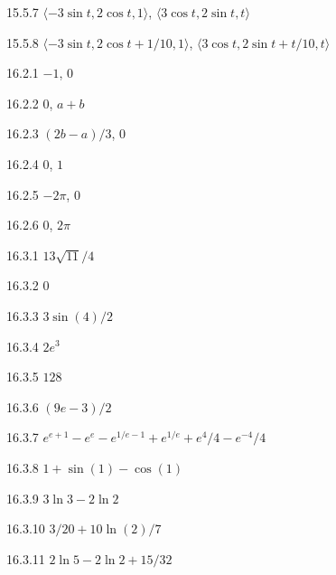 \begin{Answer}{15.5.7}
	$\langle -3\sin t,2\cos t,1\rangle$,
	$\langle 3\cos t, 2\sin t,t\rangle$
\end{Answer}
\begin{Answer}{15.5.8}
	$\langle -3\sin t,2\cos t+1/10,1\rangle$,
	$\langle 3\cos t, 2\sin t+t/10,t\rangle$
\end{Answer}
\begin{Answer}{16.2.1}
	$-1$, $0$
\end{Answer}
\begin{Answer}{16.2.2}
	$0$, $a+b$
\end{Answer}
\begin{Answer}{16.2.3}
	$(2b-a)/3$, $0$
\end{Answer}
\begin{Answer}{16.2.4}
	$0$, $1$
\end{Answer}
\begin{Answer}{16.2.5}
	$-2\pi$, $0$
\end{Answer}
\begin{Answer}{16.2.6}
	$0$, $2\pi$
\end{Answer}
\begin{Answer}{16.3.1}
	$13\sqrt{11}/4$
\end{Answer}
\begin{Answer}{16.3.2}
	$0$
\end{Answer}
\begin{Answer}{16.3.3}
	$3\sin(4)/2$
\end{Answer}
\begin{Answer}{16.3.4}
	$2e^3$
\end{Answer}
\begin{Answer}{16.3.5}
	$128$
\end{Answer}
\begin{Answer}{16.3.6}
	$(9e-3)/2$
\end{Answer}
\begin{Answer}{16.3.7}
	$e^{e+1}-e^e-e^{1/e-1}+e^{1/e}+e^4/4-e^{-4}/4$
\end{Answer}
\begin{Answer}{16.3.8}
	$1+\sin(1)-\cos(1)$
\end{Answer}
\begin{Answer}{16.3.9}
	$3\ln3-2\ln2$
\end{Answer}
\begin{Answer}{16.3.10}
	$3/20+10\ln(2)/7$
\end{Answer}
\begin{Answer}{16.3.11}
	$2\ln5-2\ln2+15/32$
\end{Answer}
